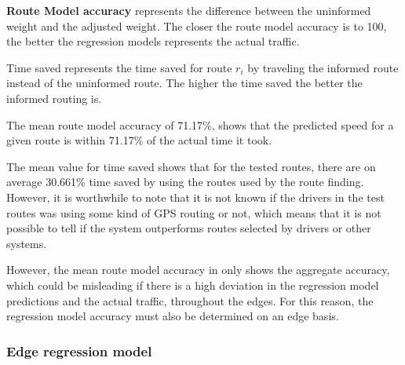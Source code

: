 \textbf{Route Model accuracy} represents the difference between the uninformed weight and the adjusted weight. The closer the route model accuracy is to 100, the better the regression models represents the actual traffic.
 
Time saved represents the time saved for route $r_i$ by traveling the informed route instead of the uninformed route. The higher the time saved the better the informed routing is.

The mean route model accuracy of 71.17\%, shows that the predicted speed for a given route is within 71.17\% of the actual time it took. 

The mean value for time saved shows that for the tested routes, there are on average 30.661\% time saved by using the routes used by the route finding. However, it is worthwhile to note that it is not known if the drivers in the test routes was using some kind of GPS routing or not, which means that it is not possible to tell if the system outperforms routes selected by drivers or other systems.

However, the mean route model accuracy in  only shows the aggregate accuracy, which could be misleading if there is a high deviation in the regression model predictions and the actual traffic, throughout the edges. For this reason, the regression model accuracy must also be determined on an edge basis.

\subsubsection{Edge regression model}